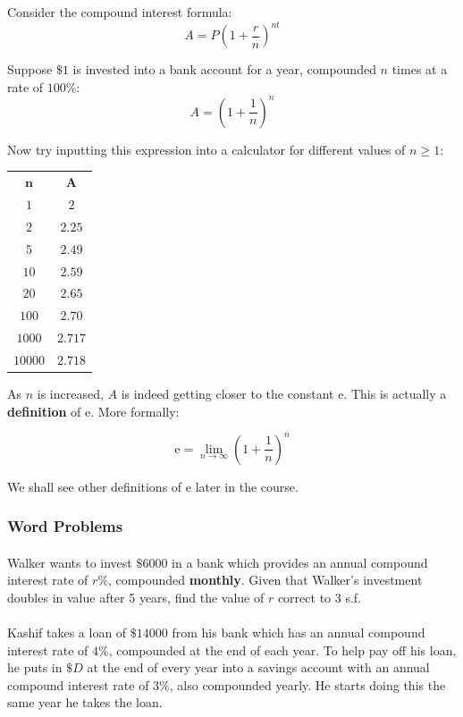 \documentclass[12pt, a4paper, titlepage, twoside]{article}
\newcommand*{\e}{\textrm{e}}
\begin{document}
	\hfill
	
	\begin{fr}[$\mathbold{e}$]
		Consider the compound interest formula:
		$$A = P\left(1+\dfrac{r}{n}\right)^{nt}$$
		
		Suppose $\$1$ is invested into a bank account for a year, compounded $n$ times at a rate of $100\%$:
		$$A = \left(1+\dfrac{1}{n}\right)^n$$
		
		Now try inputting this expression into a calculator for different values of $n \geq 1$:
		
		\begin{longtable}{|c|c|}
			\hline
			$\mathbold{n}$ & $\mathbold{A}$\\
			\hhline{|=|=|}
			$1$ & $2$\\
			\hline
			$2$ & $2.25$\\
			\hline
			$5$ & $2.49$\\
			\hline
			$10$ & $2.59$\\
			\hline
			$20$ & $2.65$\\
			\hline
			$100$ & $2.70$\\
			\hline
			$1000$ & $2.717$\\
			\hline
			$10000$ & $2.718$\\
			\hline
		\end{longtable}
		
		As $n$ is increased, $A$ is indeed getting closer to the constant $\e$. This is actually a \textbf{definition} of $\e$. More
		formally:
		
		$$\e = \lim_{n \to \infty} \left(1+\dfrac{1}{n}\right)^n$$
		
		We shall see other definitions of $\e$ later in the course.		
	\end{fr}
	
	\subsubsection*{Word Problems}
	
	\paragraph{}
	 Walker wants to invest $\$6000$ in a bank which provides an annual compound interest rate of
	$r\%$, compounded \textbf{monthly}. Given that Walker's investment doubles in value after 5 years, find the value of $r$
	correct to 3 s.f.
	
	\paragraph{}
	 Kashif takes a loan of $\$\num{14000}$ from his bank which has an annual compound interest rate of
	$4\%$, compounded at the end of each year. To help pay off his loan, he puts in $\$D$ at the end of every year into a savings 
	account with an annual compound interest rate of $3\%$, also compounded yearly. He starts doing this the same year he takes the loan.
	
\end{document}

